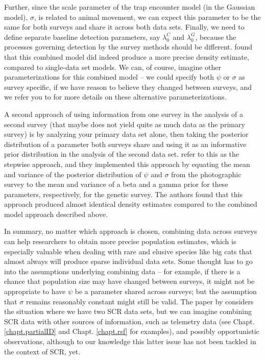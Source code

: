 Further, since the scale parameter of the trap encounter model (in
\citet{gopalaswamy_etal:2012mee} the Gaussian model), $\sigma$, is
related to animal movement, we can expect this parameter to be the
same for both surveys and share it across both data sets. Finally, we
need to define separate baseline detection parameters, say
$\lambda_{0}^{C}$ and $\lambda_{0}^{G}$, because the processes
governing detection by the survey methods should be
different. \citet{gopalaswamy_etal:2012mee} found that this combined
model did indeed produce a more precise density estimate, compared to
single-data set models.  We can, of course, imagine other
parameterizations for this combined model -- we could specify both
$\psi$ or $\sigma$ as survey specific, if we have reason to believe
they changed between surveys, and we refer you to
\citet{gopalaswamy_etal:2012mee} for more details on these alternative
parameterizations.

A second approach of using information from one survey in the analysis
of a second survey (that maybe does not yield quite as much data as
the primary survey) is by analyzing your primary data set alone, then
taking the posterior distribution of a parameter both surveys share
and using it as an informative prior distribution in the analysis of
the second data set. \citet{gopalaswamy_etal:2012mee} refer to this as
the stepwise approach, and they implemented this approach by equating
the mean and variance of the posterior distribution of $\psi$ and
$\sigma$ from the photographic survey to the mean and variance of a
beta and a gamma prior for these parameters, respectively, for the
genetic survey. The authors found that this approach produced almost
identical density estimates compared to the combined model approach
described above.

In summary, no matter which approach is chosen, combining data across
surveys can help researchers to obtain more precise population
estimates, which is especially valuable when dealing with rare and
elusive species like big cats that almost always will produce sparse
individual data sets. Some thought has to go into the assumptions
underlying combining data -- for example, if there is a chance that
population size may have changed between surveys, it might not be
appropriate to have $\psi$ be a parameter shared across surveys; but
the assumption that $\sigma$ remains reasonably constant might still
be valid. The paper by \citet{gopalaswamy_etal:2012mee} considers the
situation where we have two SCR data sets, but we can imagine
combining SCR data with other sources of information, such as
telemetry data (see Chapt. \ref{chapt.partialID} and
Chapt. \ref{chapt.rsf} for examples), and possibly opportunistic
observations, although to our knowledge this latter issue has not been
tackled in the context of SCR, yet.


